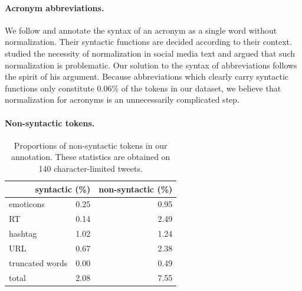 \documentclass[11pt,a4paper]{article}
\newcommand{\yjcomment}[1]{\textcolor{orange}{[$_\mathrm{L}^\mathrm{Y}$#1]}}
\newcommand{\nascomment}[1]{\textcolor{blue}{[#1 ---\textsc{nas}]}}
\newcommand{\yicomment}[1]{\textcolor{gray}{[#1 ---\textsc{Yi}]}}
\begin{document}
\paragraph{Acronym abbreviations.}  %
We follow \citet{kong-EtAl:2014:EMNLP2014} and annotate the
syntax of an acronym as a single word without normalization. Their syntactic functions
are decided according to their context. \citet{eisenstein:2013:NAACL-HLT} studied the necessity of normalization
in social media text and argued that such normalization is problematic.
Our solution to the syntax of abbreviations follows the spirit of his argument. Because abbreviations which clearly carry
syntactic functions only constitute 0.06\% of the tokens in our
dataset, we believe that normalization for acronyms is an unnecessarily complicated
step.


\paragraph{Non-syntactic tokens.}  
\begin{table}
\centering
\begin{tabular}{lrr}
\hline
\multicolumn{2}{r}{syntactic (\%)} & non-syntactic (\%)\\ \hline
emoticons & 0.25 & 0.95 \\
RT & 0.14 & 2.49\\
hashtag & 1.02 & 1.24 \\
URL & 0.67 & 2.38 \\
truncated words & 0.00 & 0.49 \\
 \hline
 total & 2.08 & 7.55 \\
 \hline
\end{tabular}
\caption{Proportions of non-syntactic tokens in our annotation. %
These statistics are obtained on 140 character-limited tweets. \label{tbl:non-synt-prop}}
\end{table}
\end{document}

